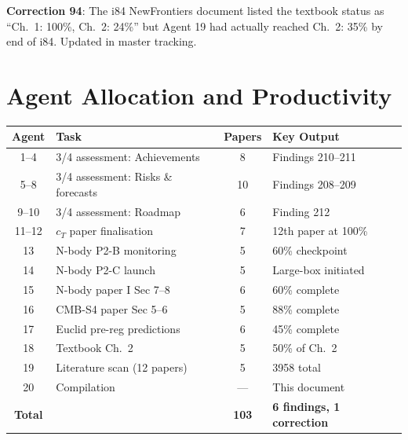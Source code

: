\documentclass[11pt,a4paper]{article}
\begin{document}
\textbf{Correction 94}: The i84 NewFrontiers document listed the textbook status as ``Ch.\ 1: 100\%, Ch.\ 2: 24\%'' but Agent 19 had actually reached Ch.\ 2: 35\% by end of i84. Updated in master tracking.

\section{Agent Allocation and Productivity}

\begin{center}
\begin{tabular}{clcl}
\toprule
\textbf{Agent} & \textbf{Task} & \textbf{Papers} & \textbf{Key Output} \\
\midrule
1--4 & 3/4 assessment: Achievements & 8 & Findings 210--211 \\
5--8 & 3/4 assessment: Risks \& forecasts & 10 & Findings 208--209 \\
9--10 & 3/4 assessment: Roadmap & 6 & Finding 212 \\
11--12 & $c_T$ paper finalisation & 7 & 12th paper at 100\% \\
13 & N-body P2-B monitoring & 5 & 60\% checkpoint \\
14 & N-body P2-C launch & 5 & Large-box initiated \\
15 & N-body paper I Sec 7--8 & 6 & 60\% complete \\
16 & CMB-S4 paper Sec 5--6 & 5 & 88\% complete \\
17 & Euclid pre-reg predictions & 6 & 45\% complete \\
18 & Textbook Ch.\ 2 & 5 & 50\% of Ch.\ 2 \\
19 & Literature scan (12 papers) & 5 & 3958 total \\
20 & Compilation & --- & This document \\
\midrule
\textbf{Total} & & \textbf{103} & \textbf{6 findings, 1 correction} \\
\bottomrule
\end{tabular}
\end{center}
\end{document}

